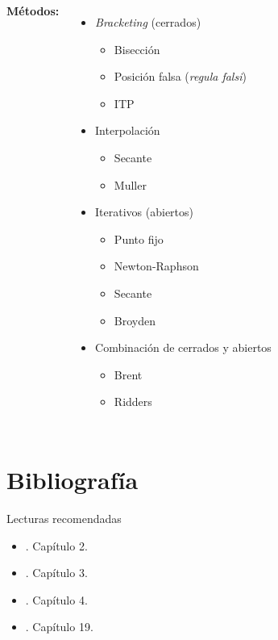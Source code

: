 \documentclass[9pt, aspectratio=169]{beamer}
\begin{document}
\begin{frame}
\begin{columns}[t]
\cx
\textbf{Métodos:}  %
\begin{itemize}
    \item \textit{Bracketing} (cerrados)
        \begin{itemize}
            \item \alert{Bisección}
        \item Posición falsa (\textit{regula falsi})
        \item ITP
        \end{itemize}
    \item Interpolación
        \begin{itemize}
        \item Secante
        \item Muller
        \end{itemize}
    \item Iterativos (abiertos)
        \begin{itemize}
            \item \alert{Punto fijo}
            \item \alert{Newton-Raphson}
            \item Secante
        \item Broyden
        \end{itemize}
    \item Combinación de cerrados y abiertos 
        \begin{itemize}
            \item {\color{blue} Brent}
        \item Ridders
        \end{itemize}
\end{itemize}
\end{columns}
\end{frame}
\section*{Bibliografía}
\begin{frame}[allowframebreaks]{Lecturas recomendadas}
\begin{itemize}
    \item {}. Capítulo 2.
    \item {}. Capítulo 3.
    \item {}. Capítulo 4.
 \item {}. Capítulo 19.
\end{itemize}
\end{frame}
\end{document}
